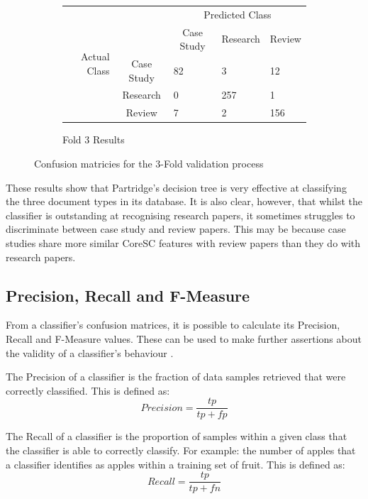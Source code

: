 \begin{figure}[!h]
\begin{subfigure}[b]{\textwidth}
\end{subfigure}

\begin{subfigure}[b]{\textwidth}

\caption{Fold 3 Results}
\centering
\begin{tabular}{ | r l l l l |}
\hline
\multirow{5}{*}{\begin{sideways}{Actual Class}\end{sideways}}
&&\multicolumn{3}{c|}{Predicted Class} \\
&& \multicolumn{1}{c}{Case Study} &	Research&	\multicolumn{1}{c|}{Review}\\
\cline{3-5}
&\multicolumn{1}{c|}{Case Study}&	82&		3	&	12 \\
&\multicolumn{1}{c|}{Research}&	0&		257	&	1\\
&\multicolumn{1}{c|}{Review}&		7&		2	&	156\\
\hline
\end{tabular}

\end{subfigure}

\caption{ Confusion matricies for the 3-Fold validation process}
\label{fig:conf_matrices}

\end{figure}

These results show that Partridge's decision tree is very effective at
classifying the three document types in its database. It is also clear,
however, that whilst the classifier is outstanding at recognising research
papers, it sometimes struggles to discriminate between case study and review
papers. This may be because case studies share more similar CoreSC features
with review papers than they do with research papers.  

\subsection{ Precision, Recall and F-Measure }

From a classifier's confusion matrices, it is possible to calculate its
Precision, Recall and F-Measure values. These can be used to make further
assertions about the validity of a classifier's behaviour
\cite{witten2005data}.

The Precision of a classifier is the fraction of data samples retrieved that
were correctly classified. This is defined as:
\[Precision = \frac{tp}{tp+fp} \]

The Recall of a classifier is the proportion of samples within a given class
that the classifier is able to correctly classify. For example: the number of
apples that a classifier identifies as apples within a training set of fruit.
This is defined as:
\[Recall = \frac{tp}{tp+fn} \]


